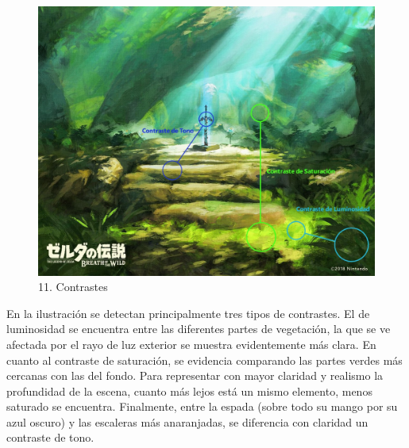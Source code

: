 \documentclass[12pt]{article}
\begin{document}
\begin{figure}[H]
       \centering
       \includegraphics[width=\textwidth]{images/Carlos/12/Contrastes.jpg}
       \caption{\small 11. Contrastes}
    \end{figure}
    En la ilustración se detectan principalmente tres tipos de contrastes. El de luminosidad se encuentra entre las diferentes partes de vegetación, la que se ve afectada por el rayo de luz exterior se muestra evidentemente más clara. En cuanto al contraste de saturación, se evidencia comparando las partes verdes más cercanas con las del fondo. Para representar con mayor claridad y realismo la profundidad de la escena, cuanto más lejos está un mismo elemento, menos saturado se encuentra. Finalmente, entre la espada (sobre todo su mango por su azul oscuro) y las escaleras más anaranjadas, se diferencia con claridad un contraste de tono.
\end{document}
